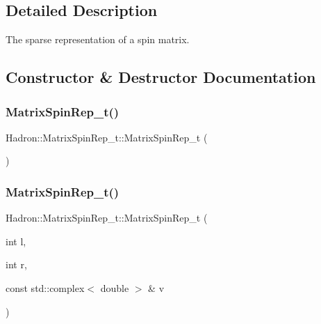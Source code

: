 \subsection{Detailed Description}
The sparse representation of a spin matrix. 

\subsection{Constructor \& Destructor Documentation}
\mbox{\label{structHadron_1_1MatrixSpinRep__t_a38258a85d8bc13c1f94ef0958795a49e}} 
\subsubsection{\texorpdfstring{MatrixSpinRep\_t()}{MatrixSpinRep\_t()}\hspace{0.1cm}{\footnotesize\ttfamily [1/6]}}
{\footnotesize\ttfamily Hadron\+::\+Matrix\+Spin\+Rep\+\_\+t\+::\+Matrix\+Spin\+Rep\+\_\+t (\begin{DoxyParamCaption}{ }\end{DoxyParamCaption})\hspace{0.3cm}{\ttfamily [inline]}}

\mbox{\label{structHadron_1_1MatrixSpinRep__t_a3a057c50dbc88ead180122518485973c}} 
\subsubsection{\texorpdfstring{MatrixSpinRep\_t()}{MatrixSpinRep\_t()}\hspace{0.1cm}{\footnotesize\ttfamily [2/6]}}
{\footnotesize\ttfamily Hadron\+::\+Matrix\+Spin\+Rep\+\_\+t\+::\+Matrix\+Spin\+Rep\+\_\+t (\begin{DoxyParamCaption}\item[{int}]{l,  }\item[{int}]{r,  }\item[{const std\+::complex$<$ double $>$ \&}]{v }\end{DoxyParamCaption})\hspace{0.3cm}{\ttfamily [inline]}}


